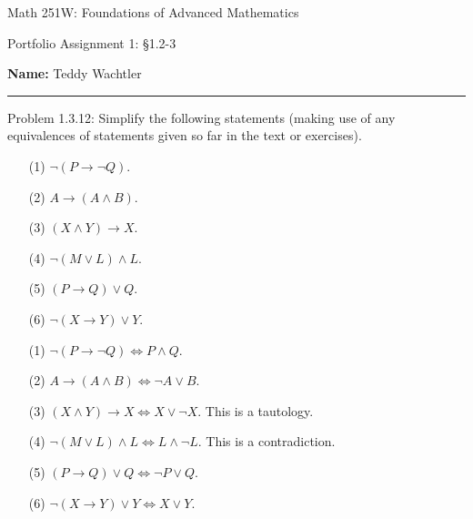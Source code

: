 \documentclass{article}
\theoremstyle{definition}
\begin{document}
	\begin{center}
		\Large{Math 251W: Foundations of Advanced Mathematics}

		\normalsize{Portfolio Assignment 1: \S 1.2-3}

		\vspace{0.2cm}

		\hfill {\bf Name:} Teddy Wachtler

		\vspace{0.25cm}
		\hrule
	\end{center}

	\vspace{0.3cm}


	\noindent Problem 1.3.12: Simplify the following statements (making use of any equivalences of statements given so far in the text or exercises).
	\begin{itemize}
		\item[(1)] $\neg(P\rightarrow \neg Q).$
		\item[(2)] $A\rightarrow (A\wedge B).$
		\item[(3)] $(X\wedge Y)\rightarrow X.$
		\item[(4)] $\neg(M\vee L)\wedge L.$
		\item[(5)] $(P\rightarrow Q)\vee Q.$
		\item[(6)] $\neg(X\rightarrow Y)\vee Y.$
	\end{itemize}

	\vspace{0.25cm}
	\begin{itemize}
		\item[(1)] $\neg(P\rightarrow \neg Q)\Leftrightarrow P\wedge Q$.
		\item[(2)] $A\rightarrow (A\wedge B) \Leftrightarrow \neg A \vee B$.
		\item[(3)] $(X\wedge Y)\rightarrow X \Leftrightarrow X\vee \neg X$. This is a tautology.
		\item[(4)] $\neg(M\vee L)\wedge L \Leftrightarrow L\wedge \neg L$. This is a contradiction.
		\item[(5)] $(P\rightarrow Q)\vee Q \Leftrightarrow \neg P\vee Q$.
		\item[(6)] $\neg(X\rightarrow Y)\vee Y \Leftrightarrow X \vee Y$.
	\end{itemize}

	\vspace{.5cm}

\end{document}
